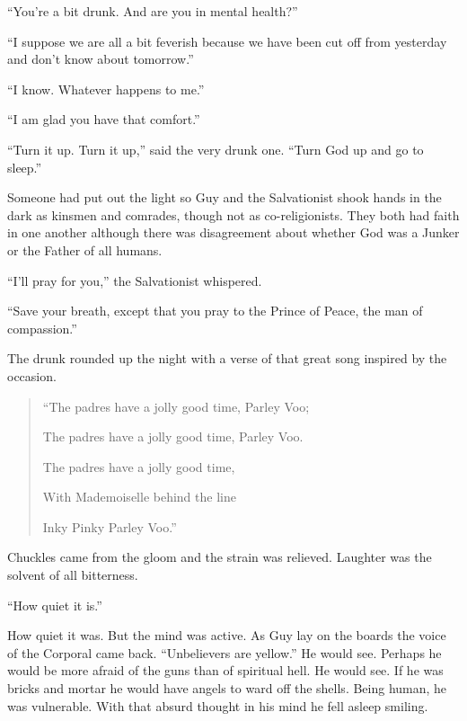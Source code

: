 ``You're a bit drunk. And are you in mental health?''

``I suppose we are all a bit feverish because we have been cut off from yesterday and don't know about tomorrow.''

``I know. Whatever happens to me.''

``I am glad you have that comfort.''

``Turn it up. Turn it up,'' said the very drunk one. ``Turn God up and go to sleep.''

Someone had put out the light so Guy and the Salvationist shook hands in the dark as kinsmen and comrades, though not as co-religionists. They both had faith in one another although there was disagreement about whether God was a Junker or the Father of all humans.

``I'll pray for you,'' the Salvationist whispered.

``Save your breath, except that you pray to the Prince of Peace, the man of compassion.''

The drunk rounded up the night with a verse of that great song inspired by the occasion.

\begin{verse}
``The padres have a jolly good time, Parley Voo;


The padres have a jolly good time, Parley Voo.


The padres have a jolly good time,


With Mademoiselle behind the line


Inky Pinky Parley Voo.''
\end{verse}

Chuckles came from the gloom and the strain was relieved. Laughter was the solvent of all bitterness.

``How quiet it is.''

How quiet it was. But the mind was active. As Guy lay on the boards the voice of the Corporal came back. ``Unbelievers are yellow.'' He would see. Perhaps he would be more afraid of the guns than of spiritual hell. He would see. If he was bricks and mortar he would have angels to ward off the shells. Being human, he was vulnerable. With that absurd thought in his mind he fell asleep smiling.